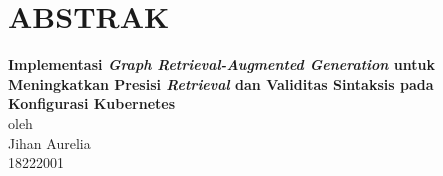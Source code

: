 \chapter*{ABSTRAK}

\begin{center}

    \textbf{Implementasi \textit{Graph Retrieval-Augmented Generation} untuk Meningkatkan Presisi \textit{Retrieval} dan Validitas Sintaksis pada Konfigurasi Kubernetes} \\
    \vspace{0.4cm}
    oleh \\
    \vspace{0.4cm}
    Jihan Aurelia\\
    18222001\\
\end{center}


